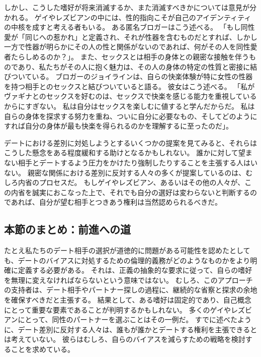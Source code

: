 \documentclass[paper=a4,book,openany]{jlreq} \usepackage{mystyle}
\begin{document}
しかし、こうした嗜好が将来消滅するか、また消滅すべきかについては意見が分かれる。
ゲイやレズビアンの中には、性的指向こそが自己のアイデンティティの中核を成すと考える者もいる。
ある匿名ブロガーはこう述べる。
「もし同性愛が「同じへの惹かれ」と定義され、それが性器を含むものだとすれば、しかし一方で性器が明らかにその人の性と関係がないのであれば、何がその人を同性愛者たらしめるのか？」\citep{soldier17:_no_havin_genit}。
また、セックスとは相手の身体との親密な接触を伴うものであり、私たちがその人に抱く魅力は、その人の身体の特定の性質と密接に結びついている。
ブロガーのジョイラインは、自らの快楽体験が特に女性の性器を持つ相手とのセックスと結びついていると語る。
彼女はこう述べる。
「私がヴァギナとのセックスを好むのは、セックスで快楽を感じる能力を重視しているからにすぎない。
私は自分はセックスを楽しむに値すると学んだからだ。
私は自らの身体を探求する努力を重ね、ついに自分に必要なもの、そしてどのようにすれば自分の身体が最も快楽を得られるのかを理解するに至ったのだ」\citep{maenzanise19:_i_dont_find_piv_sex}。

デートにおける差別に対処しようとするいくつかの提案を見てみると、それらはこうした懸念をある程度緩和する助けとなるかもしれない。
誰かに対して望まない相手とデートするよう圧力をかけたり強制したりすることを主張する人はいない。
親密な関係における差別に反対する人々の多くが提案しているのは、むしろ内省のプロセスだ。
もしゲイやレズビアン、あるいはその他の人々が、この内省を誠実におこなった上で、それでも自分の選好は変わらないと判断するのであれば、自分が望む相手とつきあう権利は当然認められるべきだ。

\subsection{本節のまとめ：前進への道}

たとえ私たちのデート相手の選択が道徳的に問題がある可能性を認めたとしても、デートのバイアスに対処するための倫理的義務がどのようなものかをより明確に定義する必要がある。
それは、正義の抽象的な要求に従って、自らの嗜好を無理に変えなければならないという意味ではない。
むしろ、このアプローチの支持者は、デート相手やパートナー探しの過程に、継続的な省察と探求の余地を確保すべきだと主張する。
結果として、ある嗜好は固定的であり、自己概念にとって重要な要素であることが判明するかもしれない。
多くのゲイやレズビアンにとって、同性のパートナーを選ぶことはその一例だ。
すでに述べたように、デート差別に反対する人々は、誰もが誰かとデートする権利を主張できるとは考えていない。
彼らはむしろ、自らのバイアスを減らすための戦略を検討することを求めている。
\end{document}
